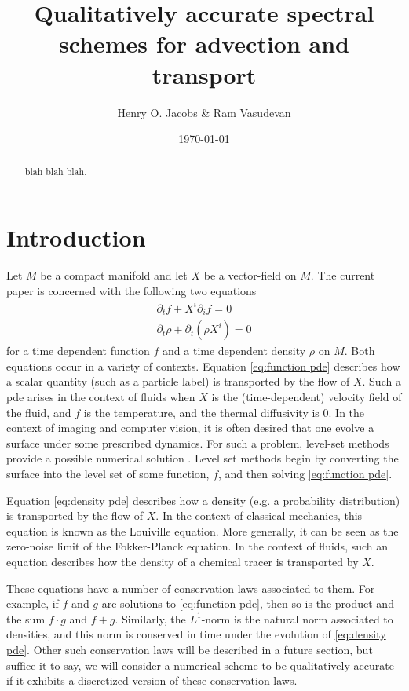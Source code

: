 \documentclass[12pt]{amsart}
\title{Qualitatively accurate spectral schemes for advection and transport}
\author{Henry O. Jacobs \& Ram Vasudevan}
\date{\today}
\begin{document}
\maketitle

\begin{abstract}
  blah blah blah.
\end{abstract}

\section{Introduction}
\label{sec:intro}

Let $M$ be a compact manifold and let $X$ be a vector-field on $M$. The current paper is concerned with the following two equations
\begin{align}
	\partial_{t} f + X^{i} \partial_{i} f = 0 \label{eq:function pde} \\
	\partial_{t} \rho + \partial_{t} (\rho X^{i}) = 0 \label{eq:density pde}
\end{align}
for a time dependent function $f$ and a time dependent density $\rho$ on $M$.
Both equations occur in a variety of contexts.
Equation \eqref{eq:function pde} describes how a scalar quantity (such as a particle label) is transported by the flow of $X$.
Such a pde arises in the context of fluids when $X$ is the (time-dependent) velocity field of the fluid, and $f$ is the temperature, and the thermal diffusivity is $0$.
In the context of imaging and computer vision, it is often desired that one evolve a surface under some prescribed dynamics.
For such a problem, level-set methods provide a possible numerical solution \cite{OsherSethian1988}.
Level set methods begin by converting the surface into the level set of some function, $f$, and then solving \eqref{eq:function pde}.

Equation \eqref{eq:density pde} describes how a density (e.g. a probability distribution) is transported by the flow of $X$.
In the context of classical mechanics, this equation is known as the Louiville equation.
More generally, it can be seen as the zero-noise limit of the Fokker-Planck equation.
In the context of fluids, such an equation describes how the density of a chemical tracer is transported by $X$.

These equations have a number of conservation laws associated to them.
For example, if $f$ and $g$ are solutions to \eqref{eq:function pde},
then so is the product and the sum $f\cdot g$ and $f+g$.
Similarly, the $L^{1}$-norm is the natural norm associated to densities, and this norm is conserved in time under the evolution of \eqref{eq:density pde}.
Other such conservation laws will be described in a future section, but suffice it to say,
we will consider a numerical scheme to be qualitatively accurate if it exhibits a discretized version of these conservation laws. 
\end{document}
